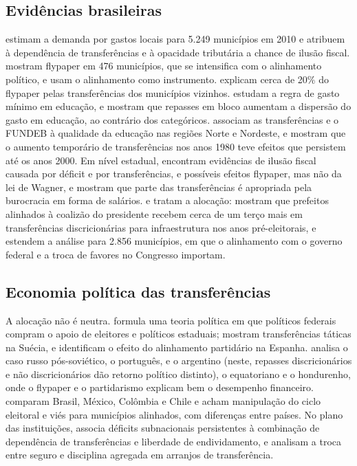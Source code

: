 \documentclass[10pt,twocolumn]{article}
\begin{document}
\subsection{Evidências brasileiras}
\citet{araujo2016} estimam a demanda por gastos locais para 5.249 municípios em 2010 e atribuem à dependência de transferências e à opacidade tributária a chance de ilusão fiscal. \citet{ferreira2019} mostram flypaper em 476 municípios, que se intensifica com o alinhamento político, e usam o alinhamento como instrumento. \citet{castro2021} explicam cerca de 20\% do flypaper pelas transferências dos municípios vizinhos. \citet{cruz2020} estudam a regra de gasto mínimo em educação, e \citet{mattos2018} mostram que repasses em bloco aumentam a dispersão do gasto em educação, ao contrário dos categóricos. \citet{bernardo2020} associam as transferências e o FUNDEB à qualidade da educação nas regiões Norte e Nordeste, e \citet{decarvalhofilho2020} mostram que o aumento temporário de transferências nos anos 1980 teve efeitos que persistem até os anos 2000. Em nível estadual, \citet{prado2020} encontram evidências de ilusão fiscal causada por déficit e por transferências, e possíveis efeitos flypaper, mas não da lei de Wagner, e \citet{marconi2009} mostram que parte das transferências é apropriada pela burocracia em forma de salários. \citet{neto2013} e \citet{brollo2012} tratam a alocação: \citet{brollo2012} mostram que prefeitos alinhados à coalizão do presidente recebem cerca de um terço mais em transferências discricionárias para infraestrutura nos anos pré-eleitorais, e \citet{ferreira2021} estendem a análise para 2.856 municípios, em que o alinhamento com o governo federal e a troca de favores no Congresso importam.

\subsection{Economia política das transferências}
A alocação não é neutra. \citet{grossman1994} formula uma teoria política em que políticos federais compram o apoio de eleitores e políticos estaduais; \citet{johansson2003} mostram transferências táticas na Suécia, e \citet{soleolle2008} identificam o efeito do alinhamento partidário na Espanha. \citet{treisman1996} analisa o caso russo pós-soviético, \citet{veiga2007} o português, \citet{porto2001} e \citet{bonvecchi2011} o argentino (neste, repasses discricionários e não discricionários dão retorno político distinto), \citet{mejiaacosta2019} o equatoriano e \citet{bastida2022} o hondurenho, onde o flypaper e o partidarismo explicam bem o desempenho financeiro. \citet{gainza2021} comparam Brasil, México, Colômbia e Chile e acham manipulação do ciclo eleitoral e viés para municípios alinhados, com diferenças entre países. No plano das instituições, \citet{rodden2002} associa déficits subnacionais persistentes à combinação de dependência de transferências e liberdade de endividamento, e \citet{sanguinetti2004} analisam a troca entre seguro e disciplina agregada em arranjos de transferência.
\end{document}
